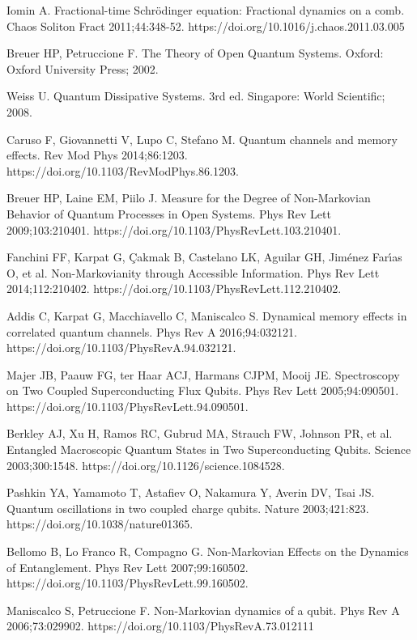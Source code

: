 \documentclass[
showpacs,  %
showkeys,  %
aps,       %
amsthm,    %
amsmath,   %
amsfonts,  %
amssymb    %
]{revtex4-1}          %
\begin{document}
\begin{thebibliography}{}
Iomin A. Fractional-time Schr\"{o}dinger equation: Fractional dynamics on a comb. Chaos Soliton Fract 2011;44:348-52. https://doi.org/10.1016/j.chaos.2011.03.005

Breuer HP, Petruccione F. The Theory of Open Quantum Systems. Oxford: Oxford University Press; 2002.

Weiss U. Quantum Dissipative Systems. 3rd ed. Singapore: World Scientific; 2008.

Caruso F, Giovannetti V, Lupo C, Stefano M. Quantum channels and memory effects. Rev Mod Phys 2014;86:1203. https://doi.org/10.1103/RevModPhys.86.1203.

Breuer HP, Laine EM, Piilo J. Measure for the Degree of Non-Markovian Behavior of Quantum Processes in Open Systems. Phys Rev Lett 2009;103:210401. https://doi.org/10.1103/PhysRevLett.103.210401.

Fanchini FF, Karpat G, \c{C}akmak B, Castelano LK, Aguilar GH, Jim\'{e}nez Far\'{\i}as O, et al. Non-Markovianity through Accessible Information. Phys Rev Lett 2014;112:210402. https://doi.org/10.1103/PhysRevLett.112.210402.

Addis C, Karpat G, Macchiavello C, Maniscalco S. Dynamical memory effects in correlated quantum channels. Phys Rev A 2016;94:032121. https://doi.org/10.1103/PhysRevA.94.032121.

Majer JB, Paauw FG, ter Haar ACJ, Harmans CJPM, Mooij JE. Spectroscopy on Two Coupled Superconducting Flux Qubits. Phys Rev Lett 2005;94:090501. https://doi.org/10.1103/PhysRevLett.94.090501.

Berkley AJ, Xu H, Ramos RC, Gubrud MA, Strauch FW, Johnson PR, et al. Entangled Macroscopic Quantum States in Two Superconducting Qubits. Science 2003;300:1548. https://doi.org/10.1126/science.1084528.

Pashkin YA, Yamamoto T, Astafiev O, Nakamura Y, Averin DV, Tsai JS. Quantum oscillations in two coupled charge qubits. Nature 2003;421:823. https://doi.org/10.1038/nature01365.

Bellomo B, Lo Franco R, Compagno G. Non-Markovian Effects on the Dynamics of Entanglement. Phys Rev Lett 2007;99:160502. https://doi.org/10.1103/PhysRevLett.99.160502.

Maniscalco S, Petruccione F. Non-Markovian dynamics of a qubit. Phys Rev A 2006;73:029902. https://doi.org/10.1103/PhysRevA.73.012111


\end{thebibliography}
\end{document}
